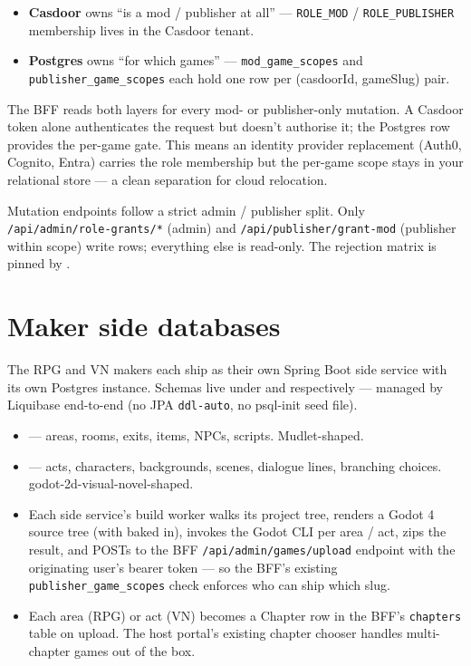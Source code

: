 \documentclass[11pt,a4paper,openany]{book}
\begin{document}
\begin{itemize}
  \item \textbf{Casdoor} owns ``is a mod / publisher at all'' ---
        \texttt{ROLE\_MOD} / \texttt{ROLE\_PUBLISHER} membership lives
        in the Casdoor tenant.
  \item \textbf{Postgres} owns ``for which games'' ---
        \texttt{mod\_game\_scopes} and \texttt{publisher\_game\_scopes}
        each hold one row per (casdoorId, gameSlug) pair.
\end{itemize}

The BFF reads both layers for every mod- or publisher-only mutation.
A Casdoor token alone authenticates the request but doesn't authorise
it; the Postgres row provides the per-game gate. This means an
identity provider replacement (Auth0, Cognito, Entra) carries the
role membership but the per-game scope stays in your relational
store --- a clean separation for cloud relocation.

Mutation endpoints follow a strict admin / publisher split. Only
\texttt{/api/admin/role-grants/*} (admin) and
\texttt{/api/publisher/grant-mod} (publisher within scope) write
rows; everything else is read-only. The rejection matrix is pinned by
.

\chapter{Maker side databases}
The RPG and VN makers each ship as their own Spring Boot side service
with its own Postgres instance. Schemas live under
 and
 respectively
--- managed by Liquibase end-to-end (no JPA \texttt{ddl-auto}, no
psql-init seed file).

\begin{itemize}
  \item {} --- areas, rooms, exits,
        items, NPCs, scripts. Mudlet-shaped.
  \item {} --- acts, characters,
        backgrounds, scenes, dialogue lines, branching choices.
        godot-2d-visual-novel-shaped.
  \item Each side service's build worker walks its project tree,
        renders a Godot 4 source tree (with
         baked in), invokes
        the Godot CLI per area / act, zips the result, and POSTs to
        the BFF \texttt{/api/admin/games/upload} endpoint with the
        originating user's bearer token --- so the BFF's existing
        \texttt{publisher\_game\_scopes} check enforces who can ship
        which slug.
  \item Each area (RPG) or act (VN) becomes a Chapter row in the BFF's
        \texttt{chapters} table on upload. The host portal's
        existing chapter chooser handles multi-chapter games out of
        the box.
\end{itemize}
\end{document}
